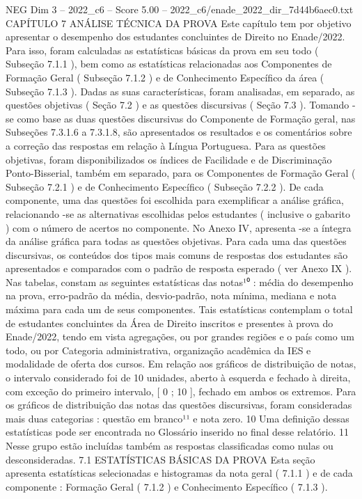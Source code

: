 \begin{textsample}{NEG Dim 3 – 2022\_c6 – Score 5.00 – 2022\_c6/enade\_2022\_dir\_7d44b6aec0.txt}  \label{ex:f3_neg_259}
CAPÍTULO 7 ANÁLISE TÉCNICA DA PROVA Este capítulo tem por objetivo apresentar o desempenho dos estudantes concluintes de Direito no Enade/2022.
Para isso, foram calculadas as estatísticas básicas da prova em seu todo ( Subseção 7.1.1 ), bem como as estatísticas relacionadas aos Componentes de Formação Geral ( Subseção 7.1.2 ) e de Conhecimento Específico da área ( Subseção 7.1.3 ).
Dadas as suas características, foram analisadas, em separado, as questões objetivas ( Seção 7.2 ) e as questões discursivas ( Seção 7.3 ).
Tomando -se como base as duas questões discursivas do Componente de Formação geral, nas Subseções 7.3.1.6 a 7.3.1.8, são apresentados os resultados e os comentários sobre a correção das respostas em relação à Língua Portuguesa.
Para as questões objetivas, foram disponibilizados os índices de Facilidade e de Discriminação Ponto-Bisserial, também em separado, para os Componentes de Formação Geral ( Subseção 7.2.1 ) e de Conhecimento Específico ( Subseção 7.2.2 ).
De cada componente, uma das questões foi escolhida para exemplificar a análise gráfica, relacionando -se as alternativas escolhidas pelos estudantes ( inclusive o gabarito ) com o número de acertos no componente.
No Anexo IV, apresenta -se a íntegra da análise gráfica para todas as questões objetivas.
Para cada uma das questões discursivas, os conteúdos dos tipos mais comuns de respostas dos estudantes são apresentados e comparados com o padrão de resposta esperado ( ver Anexo IX ).
Nas tabelas, constam as seguintes estatísticas das notas¹⁰ : média do desempenho na prova, erro-padrão da média, desvio-padrão, nota mínima, mediana e nota máxima para cada um de seus componentes.
Tais estatísticas contemplam o total de estudantes concluintes da Área de Direito inscritos e presentes à prova do Enade/2022, tendo em vista agregações, ou por grandes regiões e o país como um todo, ou por Categoria administrativa, organização acadêmica da IES e modalidade de oferta dos cursos.
Em relação aos gráficos de distribuição de notas, o intervalo considerado foi de 10 unidades, aberto à esquerda e fechado à direita, com exceção do primeiro intervalo, [ 0 ; 10 ], fechado em ambos os extremos.
Para os gráficos de distribuição das notas das questões discursivas, foram consideradas mais duas categorias : questão em branco¹¹ e nota zero. 10 Uma definição dessas estatísticas pode ser encontrada no Glossário inserido no final desse relatório. 11 Nesse grupo estão incluídas também as respostas classificadas como nulas ou desconsideradas. 7.1 ESTATÍSTICAS BÁSICAS DA PROVA Esta seção apresenta estatísticas selecionadas e histogramas da nota geral ( 7.1.1 ) e de cada componente : Formação Geral ( 7.1.2 ) e Conhecimento Específico ( 7.1.3 ).

\end{textsample}
